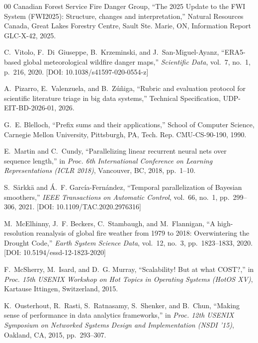 \documentclass[10pt,conference]{IEEEtran}
\begin{document}
\begin{thebibliography}{00}
Canadian Forest Service Fire Danger Group, ``The 2025 Update to the FWI System (FWI2025): Structure, changes and interpretation,'' Natural Resources Canada, Great Lakes Forestry Centre, Sault Ste. Marie, ON, Information Report GLC-X-42, 2025.

C.~Vitolo, F.~Di~Giuseppe, B.~Krzeminski, and J.~San-Miguel-Ayanz, ``ERA5-based global meteorological wildfire danger maps,'' \textit{Scientific Data}, vol.~7, no.~1, p.~216, 2020. [DOI: 10.1038/s41597-020-0554-z]

A.~Pizarro, E.~Valenzuela, and B.~Z\'u\~niga, ``Rubric and evaluation protocol for scientific literature triage in big data systems,'' Technical Specification, UDP-EIT-BD-2026-01, 2026.

G.~E. Blelloch, ``Prefix sums and their applications,'' School of Computer Science, Carnegie Mellon University, Pittsburgh, PA, Tech. Rep. CMU-CS-90-190, 1990.

E.~Martin and C.~Cundy, ``Parallelizing linear recurrent neural nets over sequence length,'' in \textit{Proc. 6th International Conference on Learning Representations (ICLR 2018)}, Vancouver, BC, 2018, pp.~1--10.

S.~S\"arkk\"a and \'A.~F. Garc\'ia-Fern\'andez, ``Temporal parallelization of Bayesian smoothers,'' \textit{IEEE Transactions on Automatic Control}, vol.~66, no.~1, pp.~299--306, 2021. [DOI: 10.1109/TAC.2020.2976316]

M.~McElhinny, J.~F. Beckers, C.~Stambaugh, and M.~Flannigan, ``A high-resolution reanalysis of global fire weather from 1979 to 2018: Overwintering the Drought Code,'' \textit{Earth System Science Data}, vol.~12, no.~3, pp.~1823--1833, 2020. [DOI: 10.5194/essd-12-1823-2020]

F.~McSherry, M.~Isard, and D.~G. Murray, ``Scalability! But at what COST?,'' in \textit{Proc. 15th USENIX Workshop on Hot Topics in Operating Systems (HotOS XV)}, Kartause Ittingen, Switzerland, 2015.

K.~Ousterhout, R.~Rasti, S.~Ratnasamy, S.~Shenker, and B.~Chun, ``Making sense of performance in data analytics frameworks,'' in \textit{Proc. 12th USENIX Symposium on Networked Systems Design and Implementation (NSDI '15)}, Oakland, CA, 2015, pp.~293--307.

\end{thebibliography}
\end{document}
